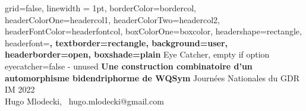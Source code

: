\documentclass[a0paper,portrait]{baposter}
\theoremstyle{definition}
\theoremstyle{remark}
\begin{document}


\begin{poster}{
	grid=false,
        linewidth = 1pt,
	borderColor=bordercol,
	headerColorOne=headercol1,
	headerColorTwo=headercol2,
	headerFontColor=headerfontcol,
	boxColorOne=boxcolor,
	headershape=rectangle,%
	headerfont=\Large\sf\bf,
	textborder=rectangle,
	background=user,
	headerborder=open,
  boxshade=plain
}
{
	Eye Catcher, empty if option eyecatcher=false - unused
}
{\sf\bf
	Une construction combinatoire d'un automorphisme bidendriphorme de WQSym
}
{
	\vspace{1em} Journées Nationales du GDR IM 2022\\ Hugo Mlodecki, \,
	{\smaller hugo.mlodecki@gmail.com}
}
{
\setlength\fboxsep{0pt}
\setlength\fboxrule{0.5pt}
}


\end{poster}
\end{document}

